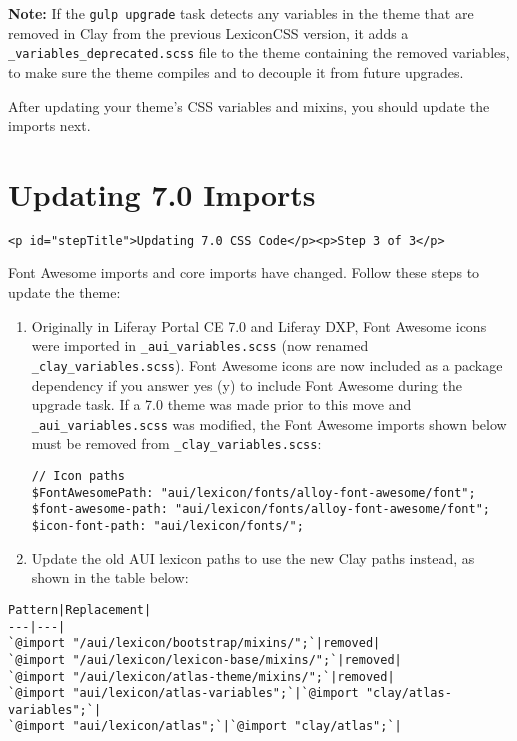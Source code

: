 \noindent\hrulefill

\textbf{Note:} If the \texttt{gulp\ upgrade} task detects any variables
in the theme that are removed in Clay from the previous LexiconCSS
version, it adds a \texttt{\_variables\_deprecated.scss} file to the
theme containing the removed variables, to make sure the theme compiles
and to decouple it from future upgrades.

\noindent\hrulefill

After updating your theme's CSS variables and mixins, you should update
the imports next.

\chapter{Updating 7.0 Imports}\label{updating-7.0-imports}

\begin{verbatim}
<p id="stepTitle">Updating 7.0 CSS Code</p><p>Step 3 of 3</p>
\end{verbatim}

Font Awesome imports and core imports have changed. Follow these steps
to update the theme:

\begin{enumerate}
\def\labelenumi{\arabic{enumi}.}
\item
  Originally in Liferay Portal CE 7.0 and Liferay DXP, Font Awesome
  icons were imported in \texttt{\_aui\_variables.scss} (now renamed
  \texttt{\_clay\_variables.scss}). Font Awesome icons are now included
  as a package dependency if you answer yes (y) to include Font Awesome
  during the upgrade task. If a 7.0 theme was made prior to this move
  and \texttt{\_aui\_variables.scss} was modified, the Font Awesome
  imports shown below must be removed from
  \texttt{\_clay\_variables.scss}:

\begin{verbatim}
// Icon paths
$FontAwesomePath: "aui/lexicon/fonts/alloy-font-awesome/font";
$font-awesome-path: "aui/lexicon/fonts/alloy-font-awesome/font";
$icon-font-path: "aui/lexicon/fonts/";
\end{verbatim}
\item
  Update the old AUI lexicon paths to use the new Clay paths instead, as
  shown in the table below:
\end{enumerate}

\noindent\hrulefill

\begin{verbatim}
Pattern|Replacement|
---|---|
`@import "/aui/lexicon/bootstrap/mixins/";`|removed|
`@import "/aui/lexicon/lexicon-base/mixins/";`|removed|
`@import "/aui/lexicon/atlas-theme/mixins/";`|removed|
`@import "aui/lexicon/atlas-variables";`|`@import "clay/atlas-variables";`|
`@import "aui/lexicon/atlas";`|`@import "clay/atlas";`|
\end{verbatim}

